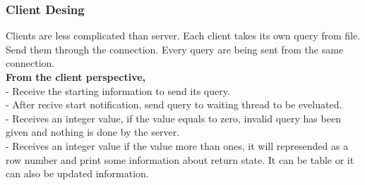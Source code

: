 \documentclass{article}
\begin{document}
\subsubsection{Client Desing}
Clients are less complicated than server. Each client takes its own query from file. Send them through the connection. Every query are being sent from the same connection.\\
\textbf{From the client perspective,}\\
- Receive the starting information to send its query.\\
- After recive start notification, send query to waiting thread to be eveluated.\\
- Receives an integer value, if the value equals to zero, invalid query has been given and nothing is done by the server.\\
- Receives an integer value if the value more than ones, it will represended as a row number and print some information about return state. It can be table or it can also be updated information.\\
\end{document}
